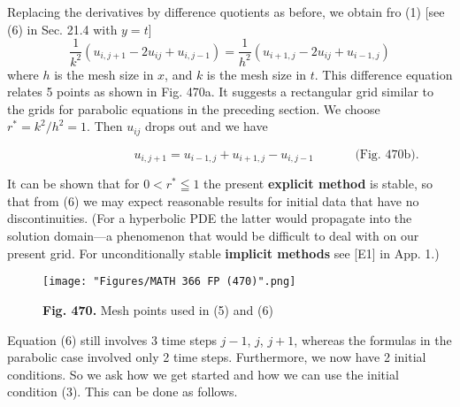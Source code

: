 Replacing the derivatives by difference quotients as before, we obtain fro (1) [see (6) in Sec. 21.4 with $y=t$]
\begin{equation}\tag{22.5}
\frac{1}{k^2}(u_{i,j+1}-2u_{ij}+u_{i,j-1})=\frac{1}{h^2}(u_{i+1,j}-2u_{ij}+u_{i-1,j})
\end{equation}
where $h$ is the mesh size in $x$, and $k$ is the mesh size in $t$. This difference equation relates 5 points as shown in Fig. 470a. It suggests a rectangular grid similar to the grids for parabolic equations in the preceding section. We choose $r^{*}=k^2/h^2=1$. Then $u_{ij}$ drops out and we have \\
\begin{graybox}
\begin{equation}\tag{22.6}
\hspace{90pt}u_{i,j+1}=u_{i-1,j}+u_{i+1,j}-u_{i,j-1}\hspace{40pt} \text{(Fig. 470b).}
\end{equation}
\end{graybox}
It can be shown that for $0<r^*\leqq 1$ the present \textbf{explicit method} is stable, so that from (6) we may expect reasonable results for initial data that have no discontinuities. (For a hyperbolic PDE the latter would propagate into the solution domain---a phenomenon that would be difficult to deal with on our present grid. For unconditionally stable \textbf{implicit methods} see [E1] in App. 1.) 
\begin{figure}[htbp]
\begin{center}
\texttt{[image: "Figures/MATH 366 FP (470)".png]}
\caption*{\small{\textbf{\color{blue} Fig. 470.}} Mesh points used in (5) and (6)}
\end{center}
\end{figure}
\newpage

Equation (6) still involves 3 time steps $j-1$, $j$, $j+1$, whereas the formulas in the parabolic case involved only 2 time steps. Furthermore, we now have 2 initial conditions. So we ask how we get started and how we can use the initial condition (3). This can be done as follows.

